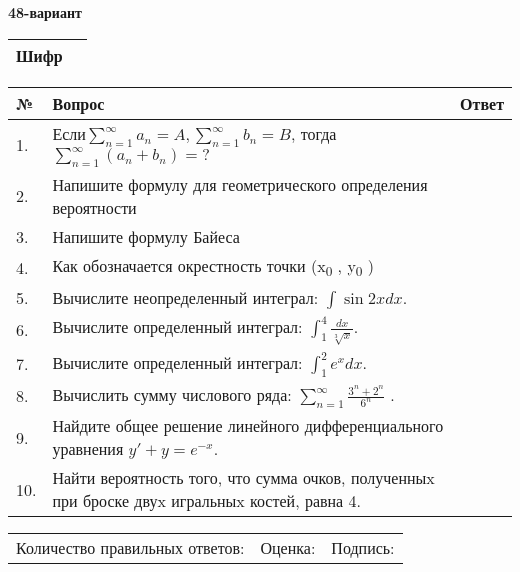 \documentclass{article}
\begin{document}
  \egroup
  
  \newpage
  
  
  \textbf{48-вариант}\\
  
  \bgroup
  \def\arraystretch{1.6} %
  
  \begin{tabular}{|m{5.7cm}|m{9.5cm}|}
  \hline
  Шифр & \\
  \hline
  \end{tabular}
  
  \vspace{1cm}
  
  \begin{tabular}{|m{0.7cm}|m{10cm}|m{4cm}|}
  \hline
  № & Вопрос & Ответ \\
  \hline
  1. & Если\(\sum_{n = 1}^{\infty}a_{n} = A,\sum_{n = 1}^{\infty}b_{n} = B\), тогда \(\sum_{n = 1}^{\infty}\left( a_{n} + b_{n} \right) = ?\) &  \\
  \hline
  2. & Напишите формулу для геометрического определения вероятности &  \\
  \hline
  3. & Напишите формулу Байеса &  \\
  \hline
  4. & Как обозначается окрестность точки (x\textsubscript{0} , y\textsubscript{0} ) &  \\
  \hline
  5. & Вычислите неопределенный интеграл: \(\int{\sin{2x}dx}\). &  \\
  \hline
  6. & Вычислите определенный интеграл: \(\int_{1}^{4}\frac{dx}{\sqrt[3]{x}}\). &  \\
  \hline
  7. & Вычислите определенный интеграл: \(\int_{1}^{2}{e^{x}dx}\). &  \\
  \hline
  8. & Вычислить сумму числового ряда: \(\sum_{n = 1}^{\infty}\frac{3^{n} + 2^{n}}{6^{n}}\) . &  \\
  \hline
  9. & Найдите общее решение линейного дифференциального уравнения \(y' + y = e^{- x}\). &  \\
  \hline
  10. & Найти вероятность того, что сумма очков, полученныx при броске двуx игральныx костей, равна 4. &  \\
  \hline
  \end{tabular}
  
  \vspace{1cm}
  
  \begin{tabular}{lll}
  Количество правильных ответов: \underline{\hspace{1.5cm}} & 
  Оценка: \underline{\hspace{1.5cm}} & 
  Подпись: \underline{\hspace{2cm}} \\
  \end{tabular}
  
\end{document}
